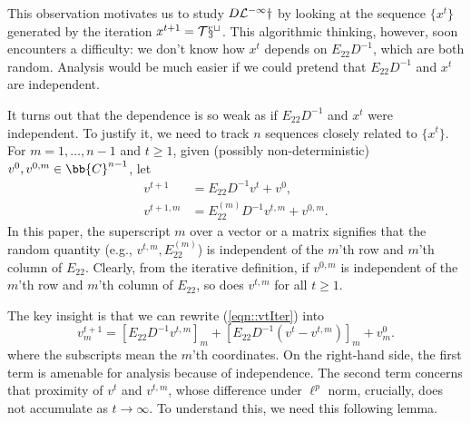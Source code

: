 \documentclass[12pt]{article}%
\theoremstyle{plain}%
\theoremstyle{remark}
\begin{document}
This observation motivates us to study $D\cal{L}^{-1}y$ by looking at the sequence $\{ x^t \}$ generated by the iteration $x^{t+1} = \cal{T} x^t$. This algorithmic thinking, however, soon encounters a difficulty: we don't know how $x^t$ depends on $E_{22}D^{-1}$, which are both random. Analysis would be much easier if we could pretend that $E_{22}D^{-1}$ and $x^t$ are independent. 

It turns out that the dependence is so weak as if $E_{22}D^{-1}$ and $x^t$ were independent. To justify it, we need to track $n$ sequences closely related to $\{x^t\}$. 
For $m = 1,\ldots, n-1$ and $t \ge 1$, given (possibly non-deterministic) $v^0, v^{0,m} \in \bb{C}^{n-1}$, let 
\begin{align}
v^{t+1} &= E_{22}D^{-1} v^t + v^0, \label{eqn::vtIter} \\
v^{t+1,m} &= E_{22}^{(m)}D^{-1} v^{t,m} + v^{0,m}. \label{eqn::vtmIter}
\end{align}
In this paper, the superscript $m$ over a vector or a matrix signifies that the random quantity (e.g., $v^{t,m}, E_{22}^{(m)}$) is independent of the $m$'th row and $m$'th column of $E_{22}$. Clearly, from the iterative definition, if $v^{0,m}$ is independent of the $m$'th row and $m$'th column of $E_{22}$, so does $v^{t,m}$ for all $t\ge 1$.

The key insight is that we can rewrite (\ref{eqn::vtIter}) into
\begin{equation*}
v^{t+1}_m = [E_{22}D^{-1} v^{t,m}]_m +  [E_{22}D^{-1} (v^t - v^{t,m})]_m + v^0_m.
\end{equation*}
where the subscripts mean the $m$'th coordinates. On the right-hand side, the first term is amenable for analysis because of independence. The second term concerns that proximity of $v^t$ and $v^{t,m}$, whose difference under $\ell^p$ norm, crucially, does not accumulate as $t \to \infty$. To understand this, we need this following lemma.
\end{document}
